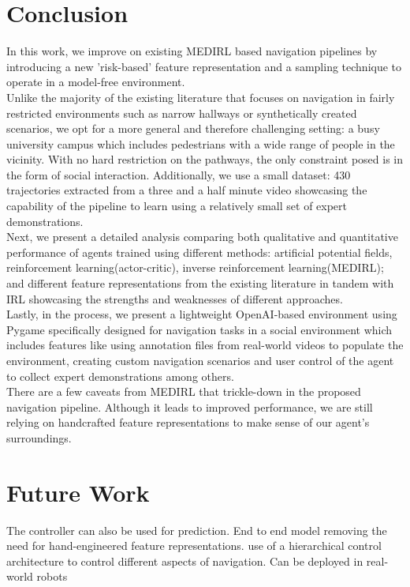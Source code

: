 \label{ch:conclusion}
\section{Conclusion}
In this work, we improve on existing MEDIRL based navigation pipelines by introducing a new 'risk-based' feature representation and a sampling technique to operate in a model-free environment. \\
Unlike the majority of the existing literature that focuses on navigation in fairly restricted environments such as narrow hallways or synthetically created scenarios, we opt for a more general and therefore challenging setting: a busy university campus which includes pedestrians with a wide range of people in the vicinity. With no hard restriction on the pathways, the only constraint posed is in the form of social interaction. Additionally, we use a small dataset: 430 trajectories extracted from a three and a half minute video showcasing the capability of the pipeline to learn using a relatively small set of expert demonstrations.\\
Next, we present a detailed analysis comparing both qualitative and quantitative performance of agents trained using different methods: artificial potential fields, reinforcement learning(actor-critic), inverse reinforcement learning(MEDIRL); and different feature representations from the existing literature in tandem with IRL showcasing the strengths and weaknesses of different approaches.\\
Lastly, in the process, we present a lightweight OpenAI-based environment using Pygame specifically designed for navigation tasks in a social environment which includes features like using annotation files from real-world videos to populate the environment, creating custom navigation scenarios and user control of the agent to collect expert demonstrations among others. \\
There are a few caveats from MEDIRL that trickle-down in the proposed navigation pipeline. Although it leads to improved performance, we are still relying on handcrafted feature representations to make sense of our agent's surroundings. \\

\section{Future Work}
The controller can also be used for prediction.
End to end model removing the need for hand-engineered feature representations.
use of a hierarchical control architecture to control different aspects of navigation.
Can be deployed in real-world robots